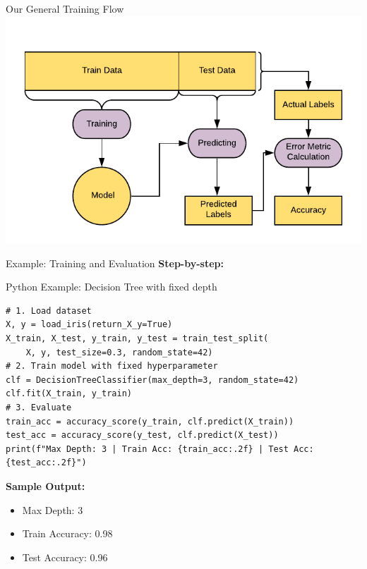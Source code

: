\documentclass{beamer}
\begin{document}
	\begin{frame}{Our General Training Flow}
	\includegraphics[width = \textwidth]{../assets/bias-variance/diagrams/general-workflow}
	\end{frame}

	\begin{frame}[fragile]{Example: Training and Evaluation}
\textbf{Step-by-step:}



\begin{block}{Python Example: Decision Tree with fixed depth}
\scriptsize
\begin{verbatim}
# 1. Load dataset
X, y = load_iris(return_X_y=True)
X_train, X_test, y_train, y_test = train_test_split(
    X, y, test_size=0.3, random_state=42)
# 2. Train model with fixed hyperparameter
clf = DecisionTreeClassifier(max_depth=3, random_state=42)
clf.fit(X_train, y_train)
# 3. Evaluate
train_acc = accuracy_score(y_train, clf.predict(X_train))
test_acc = accuracy_score(y_test, clf.predict(X_test))
print(f"Max Depth: 3 | Train Acc: {train_acc:.2f} | Test Acc: {test_acc:.2f}")
\end{verbatim}
\end{block}

\textbf{Sample Output:}
\begin{itemize}
    \item Max Depth: 3
    \item Train Accuracy: 0.98
    \item Test Accuracy: 0.96
\end{itemize}
\end{frame}
\end{document}
